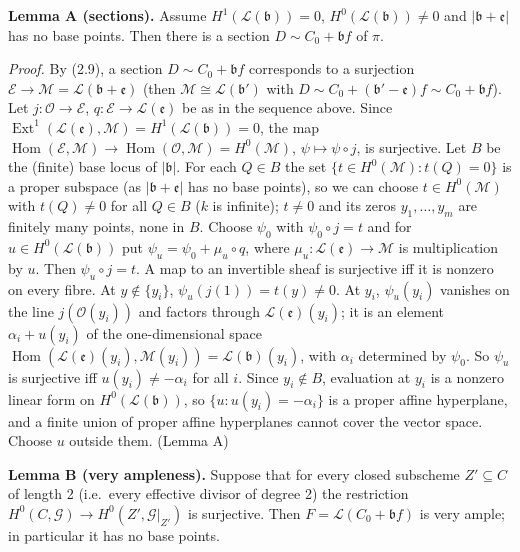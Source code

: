\documentclass[11pt]{article}
\begin{document}
\textbf{Lemma A (sections).} Assume $H^1(\mathcal L(\mathfrak b))=0$, $H^0(\mathcal L(\mathfrak b))\ne0$ and $|\mathfrak b+\mathfrak e|$ has no base points. Then there is a section $D\sim C_0+\mathfrak bf$ of $\pi$.

\emph{Proof.} By (2.9), a section $D\sim C_0+\mathfrak bf$ corresponds to a surjection $\mathcal E\to\mathcal M=\mathcal L(\mathfrak b+\mathfrak e)$ (then $\mathcal M\cong\mathcal L(\mathfrak b')$ with $D\sim C_0+(\mathfrak b'-\mathfrak e)f\sim C_0+\mathfrak bf$). Let $j\colon\mathcal O\to\mathcal E$, $q\colon\mathcal E\to\mathcal L(\mathfrak e)$ be as in the sequence above. Since $\operatorname{Ext}^1(\mathcal L(\mathfrak e),\mathcal M)=H^1(\mathcal L(\mathfrak b))=0$, the map $\operatorname{Hom}(\mathcal E,\mathcal M)\to\operatorname{Hom}(\mathcal O,\mathcal M)=H^0(\mathcal M)$, $\psi\mapsto\psi\circ j$, is surjective. Let $B$ be the (finite) base locus of $|\mathfrak b|$. For each $Q\in B$ the set $\{t\in H^0(\mathcal M): t(Q)=0\}$ is a proper subspace (as $|\mathfrak b+\mathfrak e|$ has no base points), so we can choose $t\in H^0(\mathcal M)$ with $t(Q)\ne0$ for all $Q\in B$ ($k$ is infinite); $t\ne0$ and its zeros $y_1,\dots,y_m$ are finitely many points, none in $B$. Choose $\psi_0$ with $\psi_0\circ j=t$ and for $u\in H^0(\mathcal L(\mathfrak b))$ put $\psi_u=\psi_0+\mu_u\circ q$, where $\mu_u\colon\mathcal L(\mathfrak e)\to\mathcal M$ is multiplication by $u$. Then $\psi_u\circ j=t$. A map to an invertible sheaf is surjective iff it is nonzero on every fibre. At $y\notin\{y_i\}$, $\psi_u(j(1))=t(y)\ne0$. At $y_i$, $\psi_u(y_i)$ vanishes on the line $j(\mathcal O(y_i))$ and factors through $\mathcal L(\mathfrak e)(y_i)$; it is an element $\alpha_i+u(y_i)$ of the one-dimensional space $\operatorname{Hom}(\mathcal L(\mathfrak e)(y_i),\mathcal M(y_i))=\mathcal L(\mathfrak b)(y_i)$, with $\alpha_i$ determined by $\psi_0$. So $\psi_u$ is surjective iff $u(y_i)\ne-\alpha_i$ for all $i$. Since $y_i\notin B$, evaluation at $y_i$ is a nonzero linear form on $H^0(\mathcal L(\mathfrak b))$, so $\{u:u(y_i)=-\alpha_i\}$ is a proper affine hyperplane, and a finite union of proper affine hyperplanes cannot cover the vector space. Choose $u$ outside them. \hfill(Lemma A)

\textbf{Lemma B (very ampleness).} Suppose that for every closed subscheme $Z'\subseteq C$ of length 2 (i.e.\ every effective divisor of degree 2) the restriction $H^0(C,\mathcal G)\to H^0(Z',\mathcal G|_{Z'})$ is surjective. Then $F=\mathcal L(C_0+\mathfrak bf)$ is very ample; in particular it has no base points.
\end{document}

